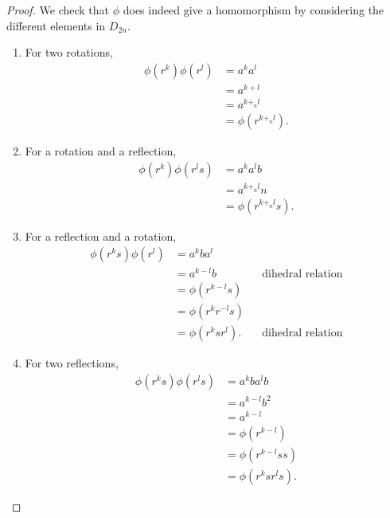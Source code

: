 \documentclass{article}
\theoremstyle{definition}
\theoremstyle{remark}
\newcommand{\pqty}[1]{\left(#1\right)}
\begin{document}
\begin{proof}
    We check that \(\phi\) does indeed give a homomorphism by considering the different elements in \(D_{2n}\).

    \begin{enumerate}
        \item For two rotations,
        \begin{align*}
            \phi\pqty{r^k} \phi\pqty{r^l} &= a^k a^l \\
            &= a^{k + l} \\
            &= a^{k +_n l} \\
            &= \phi\pqty{r^{k +_n l}}.
        \end{align*}
        \item For a rotation and a reflection,
        \begin{align*}
            \phi\pqty{r^k} \phi\pqty{r^l s} &= a^k a^l b \\
            &= a^{k +_n l} n \\
            &= \phi\pqty{r^{k +_n l} s}.
        \end{align*}
        \item For a reflection and a rotation,
        \begin{align*}
            \phi\pqty{r^k s} \phi\pqty{r^l} &= a^k b a^l \\
            &= a^{k - l} b && \text{dihedral relation} \\
            &= \phi\pqty{r^{k - l} s} \\
            &= \phi\pqty{r^k r^{-l} s} \\
            &= \phi\pqty{r^k s r^l}. && \text{dihedral relation}
        \end{align*}
        \item For two reflections,
        \begin{align*}
            \phi\pqty{r^k s} \phi\pqty{r^l s} &= a^k b a^l b \\
            &= a^{k - l} b^2 \\
            &= a^{k - l} \\
            &= \phi\pqty{r^{k - l}} \\
            &= \phi\pqty{r^{k - l} s s} \\
            &= \phi\pqty{r^{k} s r^{l} s}.
        \end{align*}
    \end{enumerate}
\end{proof}
\end{document}
